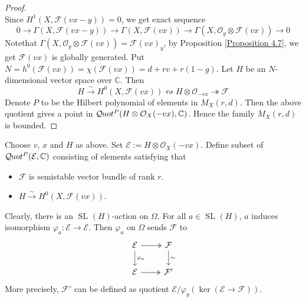 \documentclass{ctexart}
\newcommand{\quotfunctor}{\mathcal{Q}\kern -.5pt uot}
\newcommand{\speciallineargroup}[2]{\operatorname{SL}_{#1}(#2)}
\begin{document}
\begin{proof}
\begin{equation}
    \end{equation}
    Since $H^{1}(X, \mathcal{F}(vx - y)) = 0$, we get exact sequence
    \begin{equation}
        0 \longrightarrow \Gamma(X, \mathcal{F}(vx - y)) \longrightarrow \Gamma(X, \mathcal{F}(vx)) \longrightarrow \Gamma(X, \mathcal{O}_{y} \otimes \mathcal{F}(vx)) \longrightarrow 0
    \end{equation}
    Notethat $\Gamma(X, \mathcal{O}_{y} \otimes \mathcal{F}(vx)) = \mathcal{F}(vx)_{y}$,
    by Proposition \ref{Proposition 4.7}, we get $\mathcal{F}(vx)$ is globally generated.
    Put $N = h^{0}(\mathcal{F}(vx)) = \chi(\mathcal{F}(vx)) = d + rv + r(1 - g)$.
    Let $H$ be an $N$-dimensional vector space over $\mathbb{C}$.
    Then
    \begin{equation}
        H \overset{\sim}{\longrightarrow} H^{0}(X, \mathcal{F}(vx)) \leftrightsquigarrow H \otimes \mathcal{O}_{-vx} \twoheadrightarrow \mathcal{F}
    \end{equation}
    Denote $P$ to be the Hilbert polynomial of elements in $M_{X}(r, d)$.
    Then the above quotient gives a point in $\quotfunctor^{P}(H \otimes \mathcal{O}_{X}(-vx), \mathbb{C})$.
    Hence the family $M_{X}(r, d)$ is bounded.
\end{proof}
Choose $v$, $x$ and $H$ as above.
Set $\mathcal{E} := H \otimes \mathcal{O}_{X}(-vx)$.
Define subset of $\quotfunctor^{P}(\mathcal{E}, \mathbb{C})$ consisting of elements satisfying that
\begin{itemize}
    \item $\mathcal{F}$ is semistable vector bundle of rank $r$.
    \item $H \overset{\sim}{\rightarrow} H^{0}(X, \mathcal{F}(vx))$.
\end{itemize}
Clearly, there is an $\speciallineargroup{}{H}$-action on $\Omega$.
For all $a\in \speciallineargroup{}{H}$, $a$ induces isomorphism $\varphi_{a}: \mathcal{E} \rightarrow \mathcal{E}$.
Then $\varphi_{a}$ on $\Omega$ sends $\mathcal{F}$ to
\begin{equation}
    \begin{tikzcd}
        \mathcal{E} \arrow[r, twoheadrightarrow] \arrow[d, "\varphi_{a}"] &
        \mathcal{F} \arrow[d, "\sim"] \\
        \mathcal{E} \arrow[r, twoheadrightarrow] &
        \mathcal{F}' 
    \end{tikzcd}
\end{equation} 
More precisely, $\mathcal{F}'$ can be defined as quotient $\mathcal{E}/\varphi_{g}(\ker (\mathcal{E} \rightarrow \mathcal{F}))$.
\end{document}
